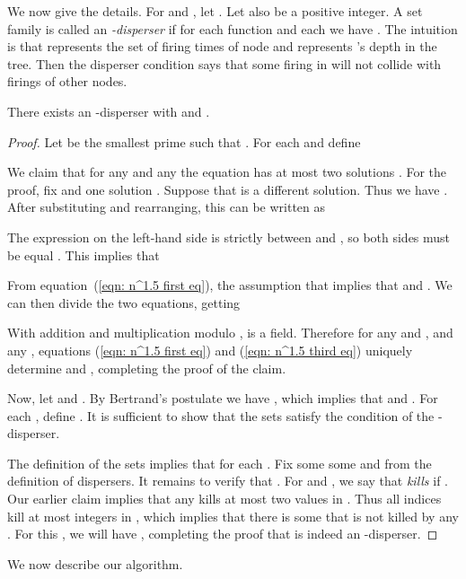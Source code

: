 We now give the details. For  and , let
. Let also  be a positive integer.
A set family  is called an \emph{-disperser} if 
for each function  and
each  we have .
The intuition is that  represents the set of firing times of node  and
  represents 's depth in the tree.
Then the disperser condition says that some firing in  will not collide
with firings of other nodes.




\begin{lemma}\label{lem: disperser}
There exists an -disperser with  and .
\end{lemma}

\begin{proof}
Let  be the smallest prime such that . 
For each  and  define

We claim that for any  and any  the equation 
 has at most two solutions .
For the proof, fix  and one solution . Suppose that
 is a different solution. Thus we have
. After substituting and 
rearranging, this can be written as

The expression on the left-hand side is strictly between  and , so
both sides must be equal . This implies that

From equation~(\ref{eqn: n^1.5 first eq}), the assumption that
 implies that  and .
We can then divide the two equations, getting

With addition and multiplication modulo ,  is a field. Therefore 
for any  and , and any , equations (\ref{eqn: n^1.5 first eq}) and (\ref{eqn: n^1.5 third eq})
uniquely determine  and , completing the proof of the claim.

\smallskip

Now, let  and . 
By Bertrand's postulate we have , which implies
that  and .
For each , define . 
It is sufficient to show that the sets  satisfy the
condition of the -disperser. 

The definition of the sets  implies that  for each .
Fix some some  and  from the definition of dispersers. It remains to
verify that .
For  and , we say that  \emph{kills} 
if .
Our earlier claim implies that any  kills at most two values in .
Thus all indices  kill at most  integers in
, which implies that there is some  that is not killed by 
any . For this , we will have
,
completing the proof that  is indeed an -disperser.
\end{proof}


We now describe our algorithm.



